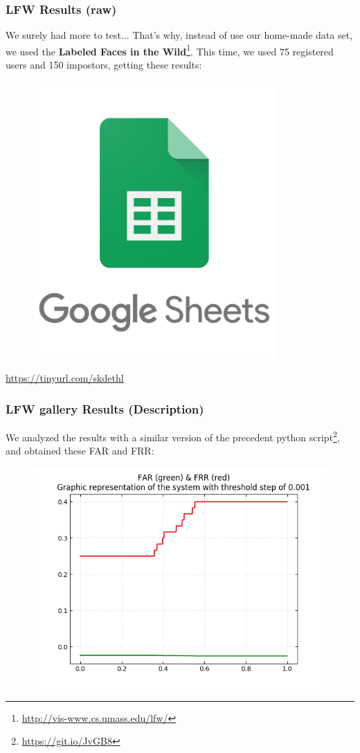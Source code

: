 \begin{frame} \frametitle{LFW Results (raw)}

	\vfill
	We surely had more to test... That's why, instead of use our home-made 
	data set, we used the \textbf{Labeled Faces in the Wild}\footnote{
	{\color{red} \url{http://vis-www.cs.umass.edu/lfw/}}}. This time, 
	we used 75 registered users and 150 impostors, getting these results:
	
	\begin{center}
		\begin{figure}[H]
			\includegraphics[width=.3\textwidth]{img/sheets}
		\end{figure}
		{\color{red} \url{https://tinyurl.com/skdethl}}	
	\end{center}
	\vfill

\end{frame}

\begin{frame} \frametitle{LFW gallery Results (Description)}

	We analyzed the results with a similar version of the precedent 
	python script\footnote{{\color{red} \url{https://git.io/JvGB8}}}, 
	and obtained these FAR and FRR:
	
	\vfill
	\begin{center}
		\begin{figure}[H]
			\includegraphics[width=.7\textwidth]{img/far-frr-lfw}
		\end{figure}
	\end{center}
	\vfill

\end{frame}
